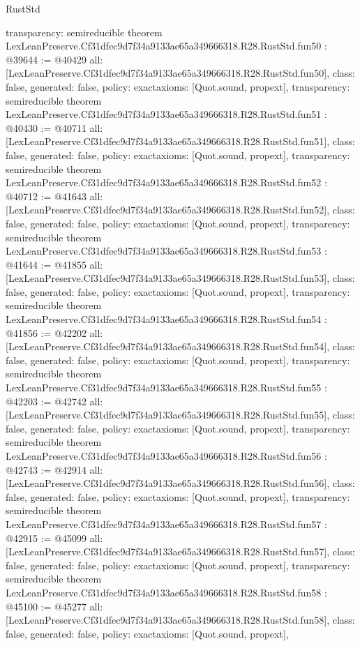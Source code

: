 \begin{lexlean}{RustStd}
\begin{coremodule}
{  transparency: semireducible
}
theorem LexLeanPreserve.Cf31dfec9d7f34a9133ae65a349666318.R28.RustStd.fun50 : @39644 := @40429 {
  all: [LexLeanPreserve.Cf31dfec9d7f34a9133ae65a349666318.R28.RustStd.fun50],
  class: false,
  generated: false,
  policy: exact{axioms: [Quot.sound, propext]},
  transparency: semireducible
}
theorem LexLeanPreserve.Cf31dfec9d7f34a9133ae65a349666318.R28.RustStd.fun51 : @40430 := @40711 {
  all: [LexLeanPreserve.Cf31dfec9d7f34a9133ae65a349666318.R28.RustStd.fun51],
  class: false,
  generated: false,
  policy: exact{axioms: [Quot.sound, propext]},
  transparency: semireducible
}
theorem LexLeanPreserve.Cf31dfec9d7f34a9133ae65a349666318.R28.RustStd.fun52 : @40712 := @41643 {
  all: [LexLeanPreserve.Cf31dfec9d7f34a9133ae65a349666318.R28.RustStd.fun52],
  class: false,
  generated: false,
  policy: exact{axioms: [Quot.sound, propext]},
  transparency: semireducible
}
theorem LexLeanPreserve.Cf31dfec9d7f34a9133ae65a349666318.R28.RustStd.fun53 : @41644 := @41855 {
  all: [LexLeanPreserve.Cf31dfec9d7f34a9133ae65a349666318.R28.RustStd.fun53],
  class: false,
  generated: false,
  policy: exact{axioms: [Quot.sound, propext]},
  transparency: semireducible
}
theorem LexLeanPreserve.Cf31dfec9d7f34a9133ae65a349666318.R28.RustStd.fun54 : @41856 := @42202 {
  all: [LexLeanPreserve.Cf31dfec9d7f34a9133ae65a349666318.R28.RustStd.fun54],
  class: false,
  generated: false,
  policy: exact{axioms: [Quot.sound, propext]},
  transparency: semireducible
}
theorem LexLeanPreserve.Cf31dfec9d7f34a9133ae65a349666318.R28.RustStd.fun55 : @42203 := @42742 {
  all: [LexLeanPreserve.Cf31dfec9d7f34a9133ae65a349666318.R28.RustStd.fun55],
  class: false,
  generated: false,
  policy: exact{axioms: [Quot.sound, propext]},
  transparency: semireducible
}
theorem LexLeanPreserve.Cf31dfec9d7f34a9133ae65a349666318.R28.RustStd.fun56 : @42743 := @42914 {
  all: [LexLeanPreserve.Cf31dfec9d7f34a9133ae65a349666318.R28.RustStd.fun56],
  class: false,
  generated: false,
  policy: exact{axioms: [Quot.sound, propext]},
  transparency: semireducible
}
theorem LexLeanPreserve.Cf31dfec9d7f34a9133ae65a349666318.R28.RustStd.fun57 : @42915 := @45099 {
  all: [LexLeanPreserve.Cf31dfec9d7f34a9133ae65a349666318.R28.RustStd.fun57],
  class: false,
  generated: false,
  policy: exact{axioms: [Quot.sound, propext]},
  transparency: semireducible
}
theorem LexLeanPreserve.Cf31dfec9d7f34a9133ae65a349666318.R28.RustStd.fun58 : @45100 := @45277 {
  all: [LexLeanPreserve.Cf31dfec9d7f34a9133ae65a349666318.R28.RustStd.fun58],
  class: false,
  generated: false,
  policy: exact{axioms: [Quot.sound, propext]},
}
\end{coremodule}
\end{lexlean}
